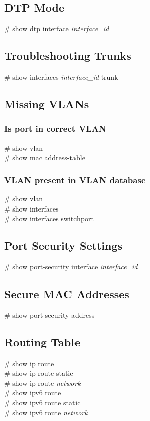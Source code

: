 \subsection{DTP Mode}
\# show dtp interface \textit{interface\_id}

\subsection{Troubleshooting Trunks}
\# show interfaces \textit{interface\_id} trunk

\subsection{Missing VLANs}
\subsubsection*{Is port in correct VLAN}
\# show vlan\\
\# show mac address-table
\subsubsection*{VLAN present in VLAN database}
\# show vlan\\
\# show interfaces\\
\# show interfaces switchport

\subsection{Port Security Settings}
\# show port-security interface \textit{interface\_id}

\subsection{Secure MAC Addresses}
\# show port-security address

\subsection{Routing Table}
\# show ip route\\
\# show ip route static\\
\# show ip route \textit{network}\vspace{11pt}\\  
\# show ipv6 route\\
\# show ipv6 route static\\
\# show ipv6 route \textit{network}

